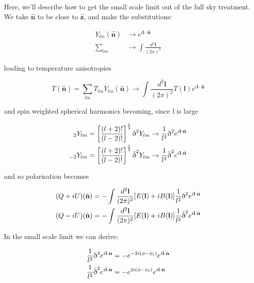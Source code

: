 \documentclass[a4paper,10pt]{article}
\renewcommand{\v}[1]{\mathbf{#1}}
\newcommand{\half}{\frac{1}{2}}
\newcommand{\finttwo}[1]{\int \frac{d^2 \v{#1}}{(2\pi)^2}}
\newcommand{\unit}[1]{\hat{\v{#1}}}
\newcommand{\sr}{\text{\normalfont\dh}}
\renewcommand{\sl}{\bar{\text{\normalfont\dh}}}
\newcommand{\ltwo}{\left[\frac{(l+2)!}{(l-2)!}\right]}
\begin{document}
Here, we'll describe how to get the small scale limit out of the full sky treatment.  We take $\unit{n}$ to be close to $\unit{z}$, and make the substitutions:

\begin{equation}
\begin{split}
Y_{lm}(\unit{n}) &\rightarrow e^{i\v{l}\cdot\unit{n}}\\
\sum_{lm} &\rightarrow \finttwo{l}
\end{split}
\end{equation}

leading to temperature anisotropies

\begin{equation}
T(\unit{n}) = \sum_{lm} T_{lm}Y_{lm}(\unit{n})\rightarrow \finttwo{l} T(\v{l})e^{i\v{l}\cdot\unit{n}}
\end{equation}

and spin weighted spherical harmonics becoming, since l is large 

\begin{equation}\begin{split}
{}_2Y_{lm} &= \ltwo^\half\sr^2Y_{lm} \rightarrow \frac{1}{l^2}\sr^2e^{i\v{l}\cdot\unit{n}}\\
{}_{-2}Y_{lm} &= \ltwo^\half\sl^2Y_{lm} \rightarrow  \frac{1}{l^2}\sl^2e^{i\v{l}\cdot\unit{n}}
\end{split}\end{equation}

and so polarisation becomes

\begin{equation}\begin{split}
(Q+iU)(\unit{n}) &= -\finttwo{l} [E(\v{l})+iB(\v{l})]  \frac{1}{l^2}\sr^2e^{i\v{l}\cdot\unit{n}}\\
(Q-iU)(\unit{n}) &= -\finttwo{l} [E(\v{l})+iB(\v{l})] \frac{1}{l^2}\sl^2e^{i\v{l}\cdot\unit{n}}
\end{split}\end{equation}

In the small scale limit we can derive:

\begin{equation}\begin{split}
\frac{1}{l^2}\sr^2e^{i\v{l}\cdot\unit{n}} &= -e^{-2i(\phi-\phi_l)}e^{i\v{l}\cdot\unit{n}}\\
\frac{1}{l^2}\sl^2e^{i\v{l}\cdot\unit{n}} &= -e^{2i(\phi-\phi_l)}e^{i\v{l}\cdot\unit{n}}
\end{split}\end{equation}
\end{document}
